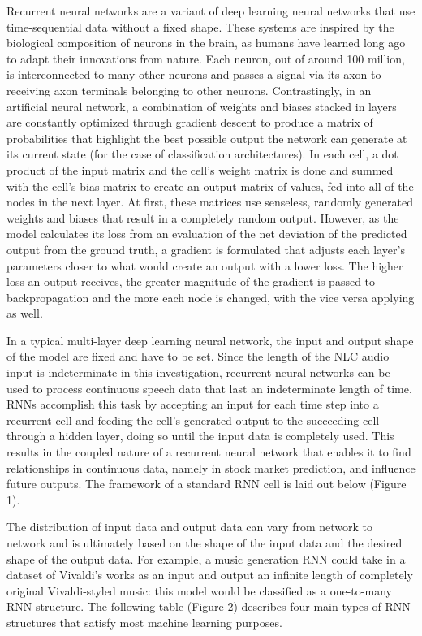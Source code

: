 Recurrent neural networks are a variant of deep learning neural networks that use time-sequential data without a fixed shape. These systems are inspired by the biological composition of neurons in the brain, as humans have learned long ago to adapt their innovations from nature. Each neuron, out of around 100 million, is interconnected to many other neurons and passes a signal via its axon to receiving axon terminals belonging to other neurons. Contrastingly, in an artificial neural network, a combination of weights and biases stacked in layers are constantly optimized through gradient descent to produce a matrix of probabilities that highlight the best possible output the network can generate at its current state (for the case of classification architectures). In each cell, a dot product of the input matrix and the cell’s weight matrix is done and summed with the cell’s bias matrix to create an output matrix of values, fed into all of the nodes in the next layer. At first, these matrices use senseless, randomly generated weights and biases that result in a completely random output. However, as the model calculates its loss from an evaluation of the net deviation of the predicted output from the ground truth, a gradient is formulated that adjusts each layer’s parameters closer to what would create an output with a lower loss. The higher loss an output receives, the greater magnitude of the gradient is passed to backpropagation and the more each node is changed, with the vice versa applying as well.
\par
In a typical multi-layer deep learning neural network, the input and output shape of the model are fixed and have to be set. Since the length of the NLC audio input is indeterminate in this investigation, recurrent neural networks can be used to process continuous speech data that last an indeterminate length of time. RNNs accomplish this task by accepting an input for each time step into a recurrent cell and feeding the cell’s generated output to the succeeding cell through a hidden layer, doing so until the input data is completely used. This results in the coupled nature of a recurrent neural network that enables it to find relationships in continuous data, namely in stock market prediction, and influence future outputs. The framework of a standard RNN cell is laid out below (Figure 1).
\par
The distribution of input data and output data can vary from network to network and is ultimately based on the shape of the input data and the desired shape of the output data. For example, a music generation RNN could take in a dataset of Vivaldi’s works as an input and output an infinite length of completely original Vivaldi-styled music: this model would be classified as a one-to-many RNN structure. The following table (Figure 2) describes four main types of RNN structures that satisfy most machine learning purposes.

